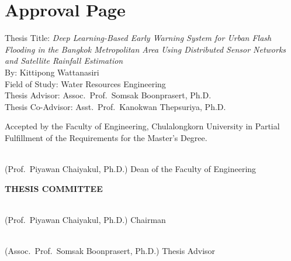 \documentclass[12pt,a4paper]{report}
\begin{document}
\setcounter{page}{2}

\chapter*{Approval Page}

\noindent
Thesis Title: \textit{Deep Learning-Based Early Warning System for Urban Flash Flooding in the Bangkok Metropolitan Area Using Distributed Sensor Networks and Satellite Rainfall Estimation}\\[4pt]
By: Kittipong Wattanasiri\\[4pt]
Field of Study: Water Resources Engineering\\[4pt]
Thesis Advisor: Assoc.\ Prof.\ Somsak Boonprasert, Ph.D.\\[4pt]
Thesis Co-Advisor: Asst.\ Prof.\ Kanokwan Thepsuriya, Ph.D.

\vspace{0.4cm}
\noindent
Accepted by the Faculty of Engineering, Chulalongkorn University in Partial Fulfillment of the Requirements for the Master's Degree.

\vspace{0.8cm}
\noindent
\begin{minipage}{\textwidth}
\hspace{2cm}\hrulefill\\
\hspace{2cm} (Prof.\ Piyawan Chaiyakul, Ph.D.) \hfill Dean of the Faculty of Engineering
\end{minipage}
\par
\vspace{1.0cm}

\noindent\textbf{THESIS COMMITTEE}

\vspace{0.6cm}
\noindent
\begin{minipage}{\textwidth}
\hspace{2cm}\hrulefill\\
\hspace{2cm} (Prof.\ Piyawan Chaiyakul, Ph.D.) \hfill Chairman
\end{minipage}
\par
\vspace{0.8cm}

\noindent
\begin{minipage}{\textwidth}
\hspace{2cm}\hrulefill\\
\hspace{2cm} (Assoc.\ Prof.\ Somsak Boonprasert, Ph.D.) \hfill Thesis Advisor
\end{minipage}
\par
\vspace{0.8cm}
\end{document}
